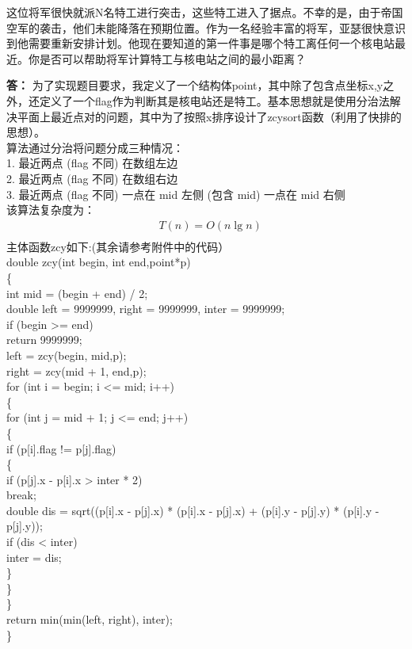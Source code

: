 \documentclass[12pt,a4paper]{article}
\begin{document}
这位将军很快就派N名特工进行突击，这些特工进入了据点。不幸的是，由于帝国空军的袭击，他们未能降落在预期位置。作为一名经验丰富的将军，亚瑟很快意识到他需要重新安排计划。他现在要知道的第一件事是哪个特工离任何一个核电站最近。你是否可以帮助将军计算特工与核电站之间的最小距离？



\vspace{5pt}
\noindent
{\bf 答：}
为了实现题目要求，我定义了一个结构体point，其中除了包含点坐标x,y之外，还定义了一个flag作为判断其是核电站还是特工。基本思想就是使用分治法解决平面上最近点对的问题，其中为了按照x排序设计了zcysort函数（利用了快排的思想）。\\
算法通过分治将问题分成三种情况： \\
1. 最近两点 (flag 不同) 在数组左边 \\
2. 最近两点 (flag 不同) 在数组右边 \\
3. 最近两点 (flag 不同) 一点在 mid 左侧 (包含 mid) 一点在 mid 右侧 \\
该算法复杂度为：\\
$$
\begin{aligned} 
&T(n)=O(n\lg{n}) \\
\end{aligned}
$$
主体函数zcy如下:(其余请参考附件中的代码） \\
double zcy(int begin, int end,point*p) \\
\{\\
    int mid = (begin + end) / 2;  \\
    double left = 9999999, right = 9999999, inter = 9999999; \\

    if (begin >= end) \\
        return 9999999; \\ 
    left = zcy(begin, mid,p);\\
    right = zcy(mid + 1, end,p);\\
    for (int i = begin; i <= mid; i++)\\
    \{\\
        for (int j = mid + 1; j <= end; j++)\\
        \{\\
            if (p[i].flag != p[j].flag)\\
            \{\\
                if (p[j].x - p[i].x > inter * 2)\\
                    break;\\
                double dis = sqrt((p[i].x - p[j].x) * (p[i].x - p[j].x) + (p[i].y - p[j].y) * (p[i].y - p[j].y));\\
                if (dis < inter)\\
                    inter = dis;\\
            \}\\
        \}\\
    \}\\
    return min(min(left, right), inter);\\
\}\\
\end{document}
